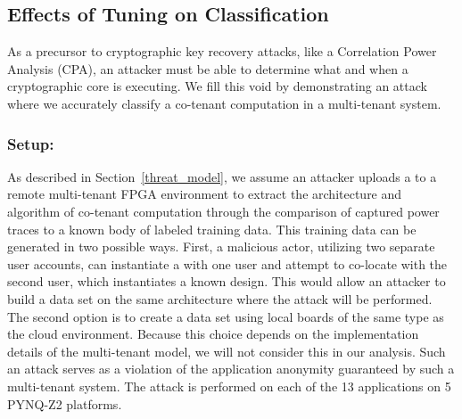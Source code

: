 

\vspace{-5pt}
\subsection{Effects of Tuning on Classification}
\label{classification}
As a precursor to cryptographic key recovery attacks, like a Correlation Power Analysis (CPA), an attacker must be able to determine what and when a cryptographic core is executing. We fill this void by demonstrating an attack where we accurately classify a co-tenant computation in a multi-tenant system. 



\subsubsection*{\textbf{Setup: }}
As described in Section~\ref{threat_model}, we assume an attacker uploads a \sensor to a remote multi-tenant FPGA environment to extract the architecture and algorithm of co-tenant computation through the comparison of captured power traces to a known body of labeled training data. 
This training data can be generated in two possible ways. First, a malicious actor, utilizing two separate user accounts, can instantiate a \sensor with one user and attempt to co-locate with the second user, which instantiates a known design. 
This would allow an attacker to build a data set on the same architecture where the attack will be performed. The second option is to create a data set using local boards of the same type as the cloud environment.
Because this choice depends on the implementation details of the multi-tenant model, we will not consider this in our analysis. 
Such an attack serves as a violation of the application anonymity guaranteed by such a multi-tenant system.
The attack is performed on each of the 13 applications on 5 PYNQ-Z2 platforms.

